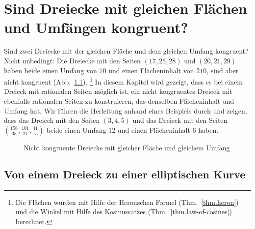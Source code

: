 
\chapter{Sind Dreiecke mit gleichen Flächen und Umfängen kongruent?}\label{c.congruent}


Sind zwei Dreiecke mit der gleichen Fläche und dem gleichen Umfang kongruent? Nicht unbedingt:  Die Dreiecke mit den Seiten $(17,25,28)$ und $(20,21,29)$ haben beide einen Umfang von $70$ und einen Flächeninhalt von $210$, sind aber nicht kongruent (Abb.~\ref{f.congruent-first-example}). \footnote{Die Flächen wurden mit Hilfe der Heronschen Formel (Thm.~\ref{thm.heron}) und die Winkel mit Hilfe des Kosinussatzes (Thm.~\ref{thm.law-of-cosines}) berechnet.} In diesem Kapitel wird gezeigt, dass es bei einem Dreieck mit rationalen Seiten möglich ist, ein nicht kongruentes Dreieck mit ebenfalls rationalen Seiten zu konstruieren, das denselben Flächeninhalt und Umfang hat.
Wir führen die Herleitung anhand eines Beispiels durch und zeigen, dass das Dreieck mit den Seiten $(3,4,5)$ und das Dreieck mit den Seiten 
$\left(\frac{156}{35}, \frac{101}{21}, \frac{41}{15}\right)$ beide einen Umfang $12$ und einen Flächeninhalt $6$ haben.

\begin{figure}[b]
\begin{center}
\end{center}
\caption{Nicht kongruente Dreiecke mit gleicher Fläche und gleichem Umfang}\label{f.congruent-first-example}
\end{figure}


\section{Von einem Dreieck zu einer elliptischen Kurve}\label{s.elliptic}

